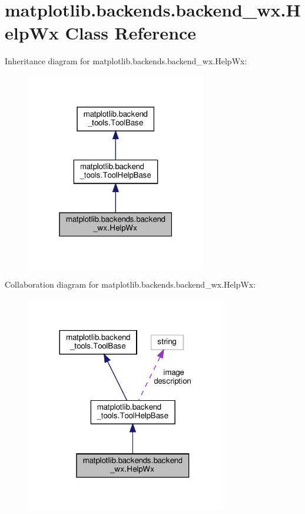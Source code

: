\hypertarget{classmatplotlib_1_1backends_1_1backend__wx_1_1HelpWx}{}\section{matplotlib.\+backends.\+backend\+\_\+wx.\+Help\+Wx Class Reference}
\label{classmatplotlib_1_1backends_1_1backend__wx_1_1HelpWx}


Inheritance diagram for matplotlib.\+backends.\+backend\+\_\+wx.\+Help\+Wx\+:
\nopagebreak
\begin{figure}[H]
\begin{center}
\leavevmode
\includegraphics[width=223pt]{classmatplotlib_1_1backends_1_1backend__wx_1_1HelpWx__inherit__graph}
\end{center}
\end{figure}


Collaboration diagram for matplotlib.\+backends.\+backend\+\_\+wx.\+Help\+Wx\+:
\nopagebreak
\begin{figure}[H]
\begin{center}
\leavevmode
\includegraphics[width=248pt]{classmatplotlib_1_1backends_1_1backend__wx_1_1HelpWx__coll__graph}
\end{center}
\end{figure}
